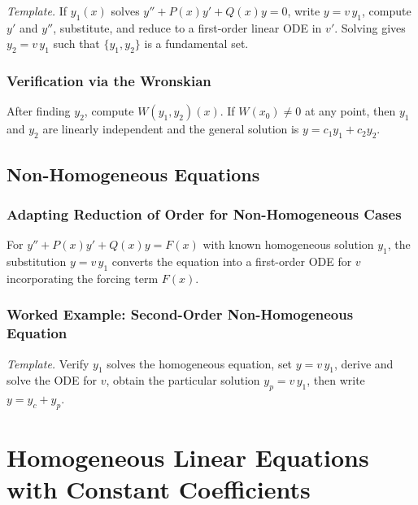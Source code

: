 \documentclass[10pt]{article}
\newcommand{\m}[1]{$#1$}
\newcommand{\annotspace}[1][3.5cm]{\vspace{#1}}
\begin{document}
    \textit{Template.} If \m{y_1(x)} solves \m{y'' + P(x)y' + Q(x)y = 0}, write \m{y = v\,y_1},
    compute \m{y'} and \m{y''}, substitute, and reduce to a first-order linear ODE in \m{v'}. Solving
    gives \m{y_2 = v\,y_1} such that \m{\{y_1, y_2\}} is a fundamental set.

    \annotspace[10cm]

    \subsubsection{Verification via the Wronskian}
    After finding \m{y_2}, compute \m{W(y_1, y_2)(x)}. If \m{W(x_0) \neq 0} at any point, then
    \m{y_1} and \m{y_2} are linearly independent and the general solution is \m{y = c_1 y_1 + c_2 y_2}.

\subsection{Non-Homogeneous Equations}

    \subsubsection{Adapting Reduction of Order for Non-Homogeneous Cases}
    For \m{y'' + P(x)y' + Q(x)y = F(x)} with known homogeneous solution \m{y_1}, the substitution
    \m{y = v\,y_1} converts the equation into a first-order ODE for \m{v} incorporating the forcing
    term \m{F(x)}.

    \subsubsection{Worked Example: Second-Order Non-Homogeneous Equation}

    \textit{Template.} Verify \m{y_1} solves the homogeneous equation, set \m{y = v\,y_1}, derive and
    solve the ODE for \m{v}, obtain the particular solution \m{y_p = v\,y_1}, then write
    \m{y = y_c + y_p}.

    \annotspace[5cm]

\section{Homogeneous Linear Equations with Constant Coefficients}
\end{document}
